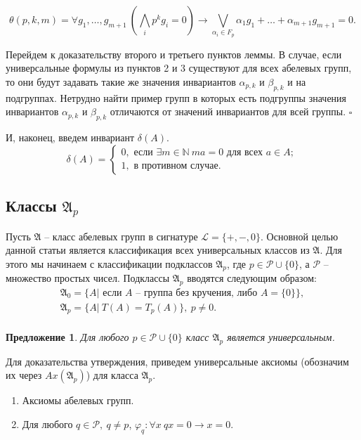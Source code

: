 \documentclass[a4paper,11pt,twoside]{article}
\newtheorem{proposition}{Предложение}[section]
\def\proof{{\noindent{\bf Доказательство.}} }
\def\A{{\mathfrak{A}}}
\def\P{{\mathcal{P}}}
\def\L{{\mathcal{L}}}
\def\N{{\mathbb{N}}}
\begin{document}
$$
\theta(p,k,m) = \forall g_1, \ldots, g_{m+1} \ (\bigwedge_i p^{k}g_{i} = 0) \rightarrow  \bigvee_{\alpha_i \in F_p} \alpha_1g_1 + \ldots + \alpha_{m+1}g_{m+1} = 0.
$$

Перейдем к доказательству второго и третьего пунктов леммы. В случае, если универсальные формулы из пунктов 2 и 3 существуют для  всех абелевых групп, то они будут задавать такие же значения инвариантов $\alpha_{p,k}$ и $\beta_{p,k}$ и на подгруппах. Нетрудно найти пример групп в которых есть подгруппы значения инвариантов $\alpha_{p,k}$ и $\beta_{p,k}$ отличаются от значений инвариантов для всей группы. $\square$

И, наконец, введем инвариант $\delta(A)$.
$$\delta(A) = \left\lbrace 
\begin{array}{l}  
0, \text{ если } \exists m \in \N \ ma = 0 \text{ для всех } a \in A; \\ 
1, \text{ в противном случае.}
\end{array} 
\right.$$


\subsection{Классы $\A_p$}

Пусть $\A$ -- класс абелевых групп в сигнатуре $\L = \{+, -, 0\}.$ Основной целью данной статьи является классификация всех универсальных классов из $\A$. Для этого мы начинаем с классификации подклассов $\A_p$, где $p \in \P \cup \{0\}$, а $\P$ -- множество простых чисел. Подклассы $\A_p$ вводятся следующим образом:
$$\begin{array}{c}
\A_0 = \{A |\text{ если } A \text{ -- группа без кручения, либо } A = \{0\} \}, \\
\A_p = \{A | \ T(A) = T_p(A)\}, \ p \neq 0. \\
\end{array}$$ 

\begin{proposition}
Для любого $p \in \P \cup \{0\}$ класс $\A_p$ является универсальным.
\end{proposition}
\proof
Для доказательства утверждения, приведем универсальные аксиомы (обозначим их через $Ax(\A_p)$) для класса $\A_p$. 
\begin{enumerate}
\item Аксиомы абелевых групп.
\item Для любого $q \in \P, \ q \neq p$, $\varphi_q : \forall x \ qx = 0 \rightarrow x = 0.$
\end{enumerate}
\end{document}

